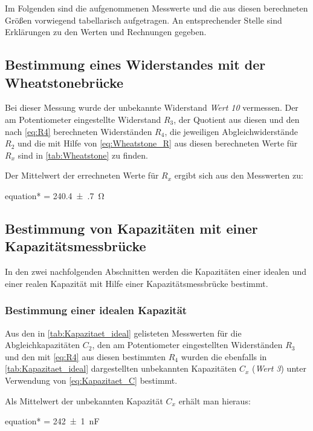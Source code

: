 Im Folgenden sind die aufgenommenen Messwerte und die aus diesen
berechneten Größen vorwiegend tabellarisch aufgetragen. An entsprechender 
Stelle sind Erklärungen zu den Werten und Rechnungen gegeben. 

\subsection{Bestimmung eines Widerstandes mit der Wheatstonebrücke}
\label{sec:Auswertung_Wheatstone}

	Bei dieser Messung wurde der unbekannte Widerstand \emph{Wert 10} vermessen.
	Der am Potentiometer eingestellte Widerstand $R_{3}$, der Quotient aus diesen und den nach \cref{eq:R4} berechneten
	Widerständen $R_{4}$, die jeweiligen
	Abgleichwiderstände $R_{2}$ und die mit Hilfe von \cref{eq:Wheatstone_R} aus diesen
	berechneten Werte für $R_{x}$ sind in \cref{tab:Wheatstone} zu finden.
	
	
	
	Der Mittelwert der errechneten Werte für $R_{x}$ ergibt sich aus den Messwerten zu:
	\begin{empheq}{equation*}
		 = \SI{240.4(7)}{\ohm}
	\end{empheq}
	
\subsection{Bestimmung von Kapazitäten mit einer Kapazitätsmessbrücke}
\label{sec:Auswertung_Kapazität}
	In den zwei nachfolgenden Abschnitten werden die Kapazitäten einer 
	idealen und einer realen Kapazität mit Hilfe einer Kapazitätsmessbrücke
	bestimmt.
	
	\subsubsection{Bestimmung einer idealen Kapazität}
	\label{sec:Auswertung_Kapazität_ideal}
		Aus den in \cref{tab:Kapazitaet_ideal} gelisteten Messwerten für die Abgleichkapazitäten
		$C_{2}$, den am Potentiometer eingestellten Widerständen $R_{3}$ und den mit \cref{eq:R4} 
		aus diesen bestimmten $R_{4}$ wurden die ebenfalls in \cref*{tab:Kapazitaet_ideal} dargestellten
		unbekannten Kapazitäten $C_{x}$ (\emph{Wert 3}) unter Verwendung von \cref{eq:Kapazitaet_C} bestimmt. 
		
			
	
		Als Mittelwert der unbekannten Kapazität $C_{x}$ erhält man hieraus:
		\begin{empheq}{equation*}
			 = \SI{242(1)}{\nano\farad}
		\end{empheq} 
	
